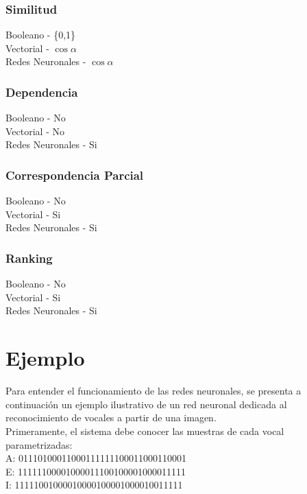 \documentclass{llncs}
\begin{document}
\subsubsection{Similitud}
Booleano -  \{0,1\} \\
Vectorial - $\cos{\alpha}$ \\
Redes Neuronales - $\cos{\alpha}$

\subsubsection{Dependencia}
Booleano -  No \\
Vectorial - No \\
Redes Neuronales - Si

\subsubsection{Correspondencia Parcial}
Booleano -  No \\
Vectorial - Si \\
Redes Neuronales - Si

\subsubsection{Ranking}
Booleano -  No \\
Vectorial - Si \\
Redes Neuronales - Si

\section{Ejemplo}

Para entender el funcionamiento de las redes neuronales, se presenta a continuaci\'on un ejemplo ilustrativo de un red neuronal dedicada al
reconocimiento de vocales a partir de una imagen.\\


Primeramente, el sistema debe conocer las muestras de cada vocal parametrizadas:\\

A: 01110100011000111111100011000110001 \\

E: 11111100001000011100100001000011111 \\

I: 11111001000010000100001000010011111 \\
\end{document}
